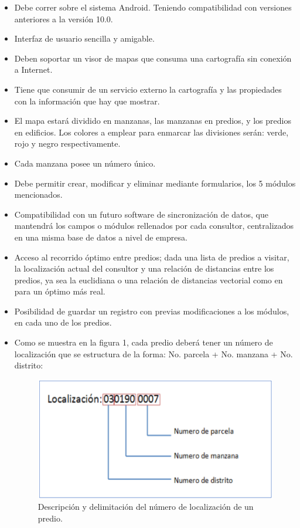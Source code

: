 \begin{itemize}
      \item Debe correr sobre el sistema Android. Teniendo compatibilidad con versiones
            anteriores a la versión 10.0.
      \item Interfaz de usuario sencilla y amigable.
      \item Deben soportar un visor de mapas que consuma una cartografía sin conexión
            a Internet.
      \item Tiene que consumir de un servicio externo la cartografía y las propiedades
            con la información que hay que mostrar.
      \item El mapa estará dividido en manzanas, las manzanas en predios, y los predios
            en edificios. Los colores a emplear para enmarcar las divisiones serán: verde,
            rojo y negro respectivamente.
      \item Cada manzana posee un número único.
      \item Debe permitir crear, modificar y eliminar mediante formularios, los 5 módulos
            mencionados.
      \item Compatibilidad con un futuro software de sincronización de datos, que
            mantendrá los campos o módulos rellenados por cada consultor,
            centralizados en una misma base de datos a nivel de empresa.
      \item Acceso al recorrido óptimo entre predios; dada una lista de predios a visitar,
            la localización actual del consultor y una relación de distancias entre los
            predios, ya sea la euclidiana o una relación de distancias vectorial como en
            para un óptimo más real.
      \item Posibilidad de guardar un registro con previas modificaciones a los módulos,
            en cada uno de los predios.
      \item Como se muestra en la figura 1, cada predio deberá tener un número de
            localización que se estructura de la forma: No. parcela + No. manzana + No.
            distrito:
            \begin{figure}[h]
                  \centering
                  \includegraphics[scale=0.5]{Graphics/localizacion_predio.png}
                  \caption{Descripción y delimitación del número de localización de un predio.} %
                  \label{fig:figura1}
            \end{figure}
\end{itemize}
